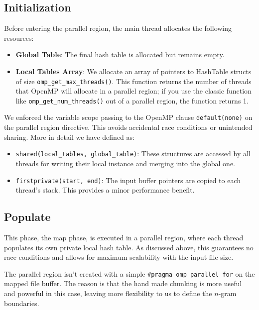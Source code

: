 \subsection{Initialization}
Before entering the parallel region, the main thread allocates the following resources:
\begin{itemize}
    \item \textbf{Global Table}: The final hash table is allocated but remains empty.
    \item \textbf{Local Tables Array}: We allocate an array of pointers to HashTable structs of size \texttt{omp\_get\_max\_threads()}. This function returns the number of threads that OpenMP will allocate in a parallel region; if you use the classic function like \texttt{omp\_get\_num\_threads()} out of a parallel region, the function returns 1.
\end{itemize}

\myskip

We enforced the variable scope passing to the OpenMP clause \texttt{default(none)} on the parallel region directive. This avoids accidental race conditions or unintended sharing. More in detail we have defined as:
\begin{itemize}
    \item \texttt{shared(local\_tables, global\_table)}: These structures are accessed by all threads for writing their local instance and merging into the global one.
    \item \texttt{firstprivate(start, end)}: The input buffer pointers are copied to each thread's stack. This provides a minor performance benefit.
\end{itemize}

\subsection{Populate}
This phase, the map phase, is executed in a parallel region, where each thread populates its own private local hash table. As discussed above, this guarantees no race conditions and allows for maximum scalability with the input file size.

The parallel region isn't created with a simple \texttt{\#pragma omp parallel for} on the mapped file buffer. The reason is that the hand made chunking is more useful and powerful in this case, leaving more flexibility to us to define the $n$-gram boundaries.

